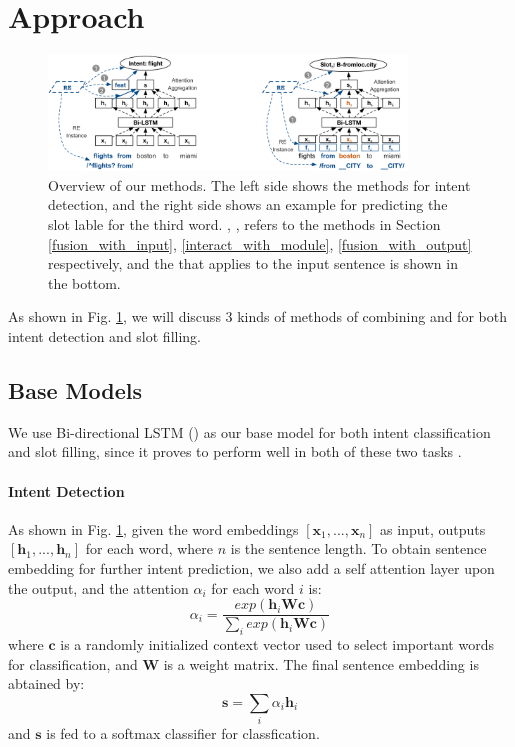 \section{Approach}

\begin{figure}[t!]
\begin{center}
\includegraphics[width=0.85\textwidth]{figure/re_nn_overview.png}    
\caption{Overview of our methods. The left side shows the methods for intent detection, and the right side shows an example for predicting the slot lable for the third word. , ,  refers to the methods in Section \ref{fusion_with_input}, \ref{interact_with_module}, \ref{fusion_with_output} respectively, and the \RE that applies to the input sentence is shown in the bottom.}
\label{fig_overview}
\end{center}
\vspace{-1em}
\end{figure}

As shown in Fig. \ref{fig_overview}, we will discuss 3 kinds of methods of combining \NN and \RE for both intent detection and slot filling.

\subsection{Base Models}
We use Bi-directional LSTM (\BLSTM) as our base \NN model for both intent classification and slot filling, since it proves to perform well in both of these two tasks \cite{liu2016attention}. 
\paragraph{Intent Detection}
As shown in Fig. \ref{fig_overview}, given the word embeddings $[\textbf{x}_1, ..., \textbf{x}_n]$ as input, \BLSTM outputs $[\textbf{h}_1, ..., \textbf{h}_n]$ for each word, where $n$ is the sentence length. To obtain sentence embedding for further intent prediction, we also add a self attention layer upon the \BLSTM output, and the attention $\alpha_i$ for each word $i$ is:
\begin{equation}
\alpha_i=\frac{exp(\textbf{h}_i\textbf{Wc})}{\sum_{i}{exp(\textbf{h}_i\textbf{Wc})}}
\end{equation}
where $\textbf{c}$ is a randomly initialized context vector used to select important words for classification, and $\textbf{W}$ is a weight matrix. The final sentence embedding is abtained by: 
\begin{equation}
\textbf{s} = \sum_{i}{\alpha_i\textbf{h}_i}
\end{equation}
and $\textbf{s}$ is fed to a softmax classifier for classfication.

